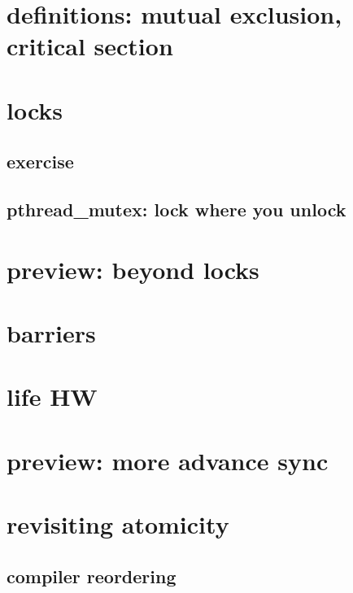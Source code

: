 \section{definitions: mutual exclusion, critical section}


\section{locks}




\subsection{exercise}


\subsection{pthread\_mutex: lock where you unlock}


\section{preview: beyond locks}



\section{barriers}


\section{life HW}



\section{preview: more advance sync}


\section{revisiting atomicity}
\subsection{compiler reordering}


